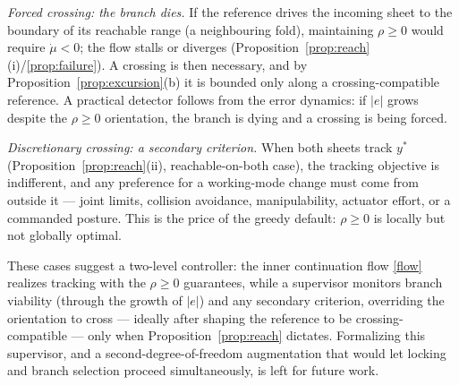 \documentclass[11pt,american]{article}
\theoremstyle{definition}
\theoremstyle{plain}
\theoremstyle{remark}
\begin{document}
\emph{Forced crossing: the branch dies.} If the reference drives the incoming sheet to the boundary of its reachable range (a neighbouring fold), maintaining $\rho\ge0$ would require $\dot\mu<0$; the flow stalls or diverges (Proposition~\ref{prop:reach}(i)/\ref{prop:failure}). A crossing is then necessary, and by Proposition~\ref{prop:excursion}(b) it is bounded only along a crossing-compatible reference. A practical detector follows from the error dynamics: if $|e|$ grows despite the $\rho\ge0$ orientation, the branch is dying and a crossing is being forced.

\emph{Discretionary crossing: a secondary criterion.} When both sheets track $y^*$ (Proposition~\ref{prop:reach}(ii), reachable-on-both case), the tracking objective is indifferent, and any preference for a working-mode change must come from outside it --- joint limits, collision avoidance, manipulability, actuator effort, or a commanded posture. This is the price of the greedy default: $\rho\ge0$ is locally but not globally optimal.

These cases suggest a two-level controller: the inner continuation flow \eqref{flow} realizes tracking with the $\rho\ge0$ guarantees, while a supervisor monitors branch viability (through the growth of $|e|$) and any secondary criterion, overriding the orientation to cross --- ideally after shaping the reference to be crossing-compatible --- only when Proposition~\ref{prop:reach} dictates. Formalizing this supervisor, and a second-degree-of-freedom augmentation that would let locking and branch selection proceed simultaneously, is left for future work.
\end{document}
